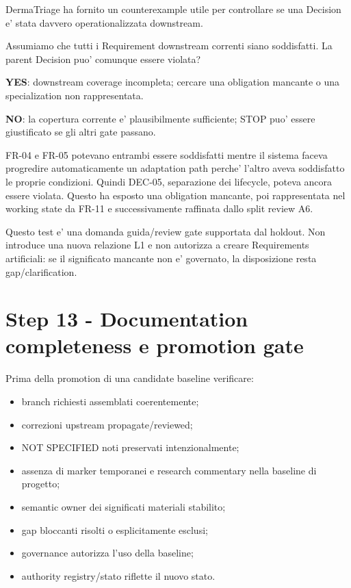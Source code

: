 \documentclass[11pt,a4paper]{article}
\begin{document}
DermaTriage ha fornito un counterexample utile per controllare se una Decision e' stata davvero operationalizzata downstream.

\begin{ddtacheck}[title={Decision-to-Requirement completeness test}]
Assumiamo che tutti i Requirement downstream correnti siano soddisfatti. La parent Decision puo' comunque essere violata?\par
\textbf{YES}: downstream coverage incompleta; cercare una obligation mancante o una specialization non rappresentata.\par
\textbf{NO}: la copertura corrente e' plausibilmente sufficiente; STOP puo' essere giustificato se gli altri gate passano.
\end{ddtacheck}

\begin{ddtaexample}[title={DermaTriage DEC-05}]
FR-04 e FR-05 potevano entrambi essere soddisfatti mentre il sistema faceva progredire automaticamente un adaptation path perche' l'altro aveva soddisfatto le proprie condizioni. Quindi DEC-05, separazione dei lifecycle, poteva ancora essere violata. Questo ha esposto una obligation mancante, poi rappresentata nel working state da FR-11 e successivamente raffinata dallo split review A6.
\end{ddtaexample}

\begin{ddtaworking}[title={Status del gate}]
Questo test e' una domanda guida/review gate supportata dal holdout. Non introduce una nuova relazione L1 e non autorizza a creare Requirements artificiali: se il significato mancante non e' governato, la disposizione resta gap/clarification.
\end{ddtaworking}

\section{Step 13 - Documentation completeness e promotion gate}
\closedtag

Prima della promotion di una candidate baseline verificare:
\begin{itemize}
  \item branch richiesti assemblati coerentemente;
  \item correzioni upstream propagate/reviewed;
  \item NOT SPECIFIED noti preservati intenzionalmente;
  \item assenza di marker temporanei e research commentary nella baseline di progetto;
  \item semantic owner dei significati materiali stabilito;
  \item gap bloccanti risolti o esplicitamente esclusi;
  \item governance autorizza l'uso della baseline;
  \item authority registry/stato riflette il nuovo stato.
\end{itemize}
\end{document}
